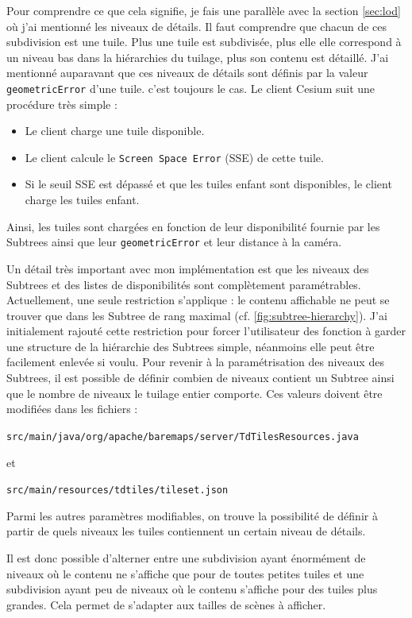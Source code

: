 Pour comprendre ce que cela signifie, je fais une parallèle avec la section \ref{sec:lod} où j'ai mentionné les niveaux de détails. Il faut comprendre que chacun de ces subdivision est une tuile. Plus une tuile est subdivisée, plus elle elle correspond à un niveau bas dans la hiérarchies du tuilage, plus son contenu est détaillé. J'ai mentionné auparavant que ces niveaux de détails sont définis par la valeur \texttt{geometricError} d'une tuile. c'est toujours le cas. Le client Cesium suit une procédure très simple :

\begin{itemize}
    \item Le client charge une tuile disponible.
    \item Le client calcule le \texttt{Screen Space Error} (SSE) de cette tuile.
    \item Si le seuil SSE est dépassé et que les tuiles enfant sont disponibles, le client charge les tuiles enfant.
\end{itemize}

Ainsi, les tuiles sont chargées en fonction de leur disponibilité fournie par les Subtrees ainsi que leur \texttt{geometricError} et leur distance à la caméra.

\newpage
Un détail très important avec mon implémentation est que les niveaux des Subtrees et des listes de disponibilités sont complètement paramétrables. Actuellement, une seule restriction s'applique :  le contenu affichable ne peut se trouver que dans les Subtree de rang maximal (cf. \autoref{fig:subtree-hierarchy}). J'ai initialement rajouté cette restriction pour forcer l'utilisateur des fonction à garder une structure de la hiérarchie des Subtrees simple, néanmoins elle peut être facilement enlevée si voulu. Pour revenir à la paramétrisation des niveaux des Subtrees, il est possible de définir combien de niveaux contient un Subtree ainsi que le nombre de niveaux le tuilage entier comporte. Ces valeurs doivent être modifiées dans les fichiers :

\texttt{src/main/java/org/apache/baremaps/server/TdTilesResources.java}

et

\texttt{src/main/resources/tdtiles/tileset.json}

Parmi les autres paramètres modifiables, on trouve la possibilité de définir à partir de quels niveaux les tuiles contiennent un certain niveau de détails.

Il est donc possible d'alterner entre une subdivision ayant énormément de niveaux où le contenu ne s'affiche que pour de toutes petites tuiles et une subdivision ayant peu de niveaux où le contenu s'affiche pour des tuiles plus grandes. Cela permet de s'adapter aux tailles de scènes à afficher.